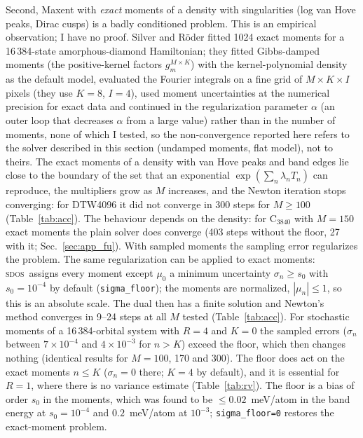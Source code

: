 \documentclass[reprint,nofootinbib,superscriptaddress,amsmath,amssymb,aps,prb,floatfix]{revtex4-2}
\newcommand{\sdos}{\textsc{sdos}}
\begin{document}
Second, Maxent with \emph{exact} moments of a density with singularities (log van Hove peaks, Dirac cusps) is a badly conditioned problem. This is an empirical observation; I have no proof. Silver and R\"oder \cite{silver1997} fitted 1024 exact moments for a 16\,384-state amorphous-diamond Hamiltonian; they fitted Gibbs-damped moments (the positive-kernel factors $g_m^{M\times K}$) with the kernel-polynomial density as the default model, evaluated the Fourier integrals on a fine grid of $M\times K\times I$ pixels (they use $K=8$, $I=4$), used moment uncertainties at the numerical precision for exact data and continued in the regularization parameter $\alpha$ (an outer loop that decreases $\alpha$ from a large value) rather than in the number of moments, none of which I tested, so the non-convergence reported here refers to the solver described in this section (undamped moments, flat model), not to theirs. The exact moments of a density with van Hove peaks and band edges lie close to the boundary of the set that an exponential $\exp(\sum_n\lambda_nT_n)$ can reproduce, the multipliers grow as $M$ increases, and the Newton iteration stops converging: for DTW4096 it did not converge in 300 steps for $M\ge100$ (Table~\ref{tab:acc}). The behaviour depends on the density: for C$_{3840}$ with $M=150$ exact moments the plain solver does converge (403 steps without the floor, 27 with it; Sec.~\ref{sec:app_fu}). With sampled moments the sampling error regularizes the problem.
The same regularization can be applied to exact moments: \sdos\ assigns every moment except $\mu_0$ a minimum uncertainty $\sigma_n\ge s_0$ with $s_0=10^{-4}$ by default (\texttt{sigma\_floor}); the moments are normalized, $|\mu_n|\le1$, so this is an absolute scale.
The dual then has a finite solution and Newton's method converges in 9--24 steps at all $M$ tested (Table~\ref{tab:acc}). For stochastic moments of a 16\,384-orbital system with $R=4$ and $K=0$ the sampled errors ($\sigma_n$ between $7\times10^{-4}$ and $4\times10^{-3}$ for $n>K$) exceed the floor, which then changes nothing (identical results for $M=100$, 170 and 300). The floor does act on the exact moments $n\le K$ ($\sigma_n=0$ there; $K=4$ by default), and it is essential for $R=1$, where there is no variance estimate (Table~\ref{tab:rv}).
The floor is a bias of order $s_0$ in the moments, which was found to be $\le0.02$~meV/atom in the band energy at $s_0=10^{-4}$ and $0.2$~meV/atom at $10^{-3}$; \texttt{sigma\_floor=0} restores the exact-moment problem.
\end{document}
